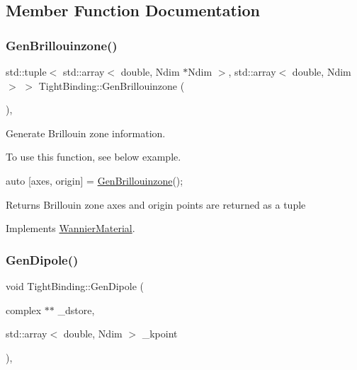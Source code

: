 \subsection{Member Function Documentation}
\mbox{\label{class_tight_binding_a81458687424088fd6e549b861dc42ae4}} 
\subsubsection{\texorpdfstring{Gen\+Brillouinzone()}{GenBrillouinzone()}}
{\footnotesize\ttfamily std\+::tuple$<$ std\+::array$<$ double, Ndim $\ast$Ndim $>$, std\+::array$<$ double, Ndim $>$ $>$ Tight\+Binding\+::\+Gen\+Brillouinzone (\begin{DoxyParamCaption}{ }\end{DoxyParamCaption})\hspace{0.3cm}{\ttfamily [override]}, {\ttfamily [virtual]}}



Generate Brillouin zone information. 

To use this function, see below example.
\begin{DoxyCode}
\textcolor{keyword}{auto} [axes, origin] = \hyperlink{class_tight_binding_a81458687424088fd6e549b861dc42ae4}{GenBrillouinzone}(); 
\end{DoxyCode}
 \begin{DoxyReturn}{Returns}
Brillouin zone axes and origin points are returned as a tuple 
\end{DoxyReturn}


Implements \hyperlink{class_wannier_material_af261bdc2dcb97e0b8c3a8d22d52d000a}{Wannier\+Material}.

\mbox{\label{class_tight_binding_a35d001bd21173065f9f3b2de595b5af6}} 
\subsubsection{\texorpdfstring{Gen\+Dipole()}{GenDipole()}}
{\footnotesize\ttfamily void Tight\+Binding\+::\+Gen\+Dipole (\begin{DoxyParamCaption}\item[{complex $\ast$$\ast$}]{\+\_\+dstore,  }\item[{std\+::array$<$ double, Ndim $>$}]{\+\_\+kpoint }\end{DoxyParamCaption})\hspace{0.3cm}{\ttfamily [override]}, {\ttfamily [virtual]}}



